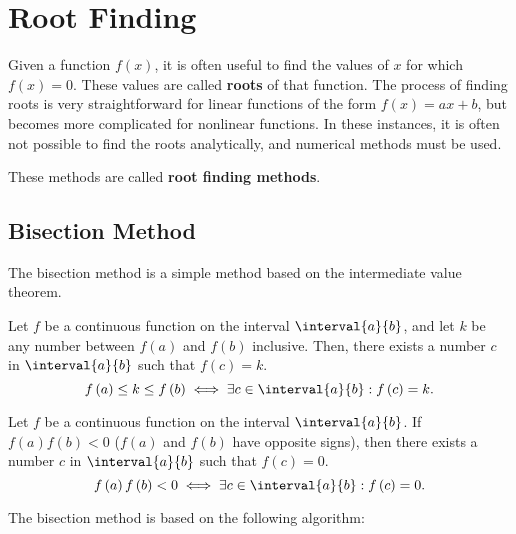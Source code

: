 \documentclass{article}
\begin{document}
\section{Root Finding}
Given a function \(f\left( x \right)\), it is often useful to find the values of \(x\) for which \(f\left( x \right) = 0\).
These values are called \textbf{roots} of that function. The process of finding roots is very straightforward
for linear functions of the form \(f\left( x \right) = a x + b\), but becomes more complicated for nonlinear functions.
In these instances, it is often not possible to find the roots analytically, and numerical methods must be used.

These methods are called \textbf{root finding methods}.
\subsection{Bisection Method}
The bisection method is a simple method based on the intermediate value theorem.
\begin{theorem}
    Let \(f\) be a continuous function on the interval \(\interval{a}{b}\),
    and let \(k\) be any number between \(f\left( a \right)\) and \(f\left( b \right)\) inclusive.
    Then, there exists a number \(c\) in \(\interval{a}{b}\) such that \(f\left( c \right) = k\).
    \begin{equation*}
        f\left( a \right) \leq k \leq f\left( b \right) \iff \exists c \in \interval{a}{b} : f\left( c \right) = k.
    \end{equation*}
\end{theorem}
\begin{corollary}
    Let \(f\) be a continuous function on the interval \(\interval{a}{b}\).
    If \(f\left( a \right) f\left( b \right) < 0\) (\(f\left( a \right)\) and \(f\left( b \right)\) have opposite signs),
    then there exists a number \(c\) in \(\interval{a}{b}\) such that \(f\left( c \right) = 0\).
    \begin{equation*}
        f\left( a \right) f\left( b \right) < 0 \iff \exists c \in \interval{a}{b} : f\left( c \right) = 0.
    \end{equation*}
\end{corollary}
The bisection method is based on the following algorithm:
\end{document}

